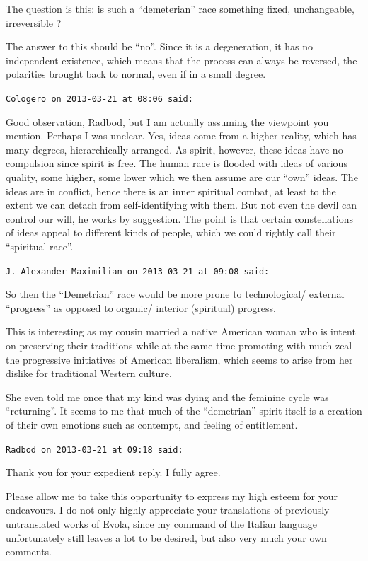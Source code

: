 \begin{footnotesize}
\begin{sffamily}
The question is this: is such a ``demeterian'' race something fixed, unchangeable, irreversible ?

The answer to this should be ``no''. Since it is a degeneration, it has no independent existence, which means that the process can always be reversed, the polarities brought back to normal, even if in a small degree.

\hfill

\texttt{Cologero on 2013-03-21 at 08:06 said:}

Good observation, Radbod, but I am actually assuming the viewpoint you mention. Perhaps I was unclear. Yes, ideas come from a higher reality, which has many degrees, hierarchically arranged. As spirit, however, these ideas have no compulsion since spirit is free. The human race is flooded with ideas of various quality, some higher, some lower which we then assume are our ``own'' ideas. The ideas are in conflict, hence there is an inner spiritual combat, at least to the extent we can detach from self-identifying with them. But not even the devil can control our will, he works by suggestion. The point is that certain constellations of ideas appeal to different kinds of people, which we could rightly call their ``spiritual race''.

\hfill

\texttt{J. Alexander Maximilian on 2013-03-21 at 09:08 said:}

So then the ``Demetrian'' race would be more prone to technological/ external ``progress'' as opposed to organic/ interior (spiritual) progress.

This is interesting as my cousin married a native American woman who is intent on preserving their traditions while at the same time promoting with much zeal the progressive initiatives of American liberalism, which seems to arise from her dislike for traditional Western culture.

She even told me once that my kind was dying and the feminine cycle was ``returning''. It seems to me that much of the ``demetrian'' spirit itself is a creation of their own emotions such as contempt, and feeling of entitlement.

\hfill

\texttt{Radbod on 2013-03-21 at 09:18 said:}

Thank you for your expedient reply. I fully agree.

Please allow me to take this opportunity to express my high esteem for your endeavours. I do not only highly appreciate your translations of previously untranslated works of Evola, since my command of the Italian language unfortunately still leaves a lot to be desired, but also very much your own comments.


\end{sffamily}
\end{footnotesize}
